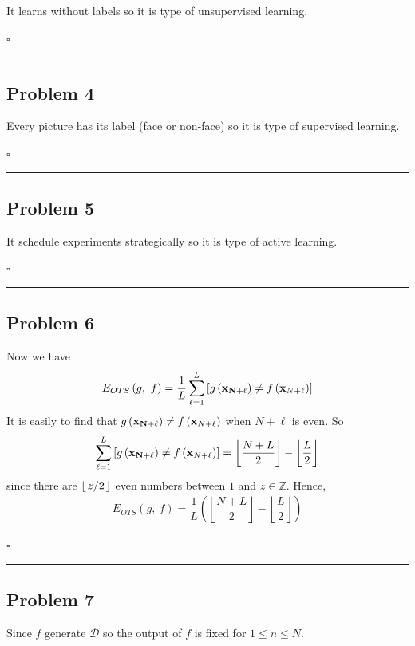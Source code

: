 \documentclass[12pt]{article}
\newcommand*{\QEDB}{\hfill\ensuremath{\square}}
\newcommand{\SBrackets}[1]{\left[#1\right]}
\newcommand{\ParTh}[1]{\left(#1\right)}
\newcommand{\Floor}[1]{\left\lfloor#1\right\rfloor}
\newcommand{\BF}[1]{{\bf#1}}
\newcommand{\Divide}[2]{\left.#1\middle/#2\right.}
\newcommand{\horrule}[1]{\rule{\linewidth}{#1}}
\begin{document}
It learns without labels so it is type of unsupervised learning.

\QEDB

\horrule{0.5pt}

\subsection*{Problem 4}

Every picture has its label (face or non-face) so it is type of supervised learning.

\QEDB

\horrule{0.5pt}

\subsection*{Problem 5}

It schedule experiments strategically so it is type of active learning.

\QEDB

\horrule{0.5pt}

\subsection*{Problem 6}

Now we have
\begin{align}
E_{OTS}\ParTh{g,~f}=\dfrac{1}{L}\sum_{\ell=1}^{L}\SBrackets{g\ParTh{\BF{x_{N+\ell}}}\neq f\ParTh{\BF{x}_{N+\ell}}}
\end{align}
It is easily to find that $g\ParTh{\BF{x_{N+\ell}}}\neq f\ParTh{\BF{x}_{N+\ell}}$ when $N+\ell$ is even. So
\begin{align}
\sum_{\ell=1}^{L}\SBrackets{g\ParTh{\BF{x_{N+\ell}}}\neq f\ParTh{\BF{x}_{N+\ell}}}=\left\lfloor\dfrac{N+L}{2}\right\rfloor-\Floor{\dfrac{L}{2}}
\end{align}
since there are $\Floor{\Divide{z}{2}}$ even numbers between $1$ and $z\in\mathbb{Z}$. Hence,
\begin{align}
E_{OTS}\ParTh{g,~f}=\dfrac{1}{L}\ParTh{\left\lfloor\dfrac{N+L}{2}\right\rfloor-\Floor{\dfrac{L}{2}}}
\end{align}

\QEDB

\horrule{0.5pt}

\subsection*{Problem 7}

Since $f$ generate $\mathcal{D}$ so the output of $f$ is fixed for $1\leq n\leq N$.
\end{document}
